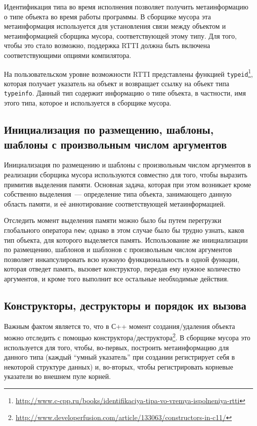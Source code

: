 Идентификация типа во время исполнения позволяет получить метаинформацию о типе объекта во время работы программы. 
В сборщике мусора эта метаинформация используется для установления связи между объектом и метаинформацией сборщика
мусора, соответствующей этому типу. Для того, чтобы это стало возможно, поддержка RTTI должна быть включена 
соответствующими опциями компилятора.

На пользовательском уровне возможности RTTI представлены функцией \lstinline{typeid}\footnote{\url{http://www.c-cpp.ru/books/identifikaciya-tipa-vo-vremya-ispolneniya-rtti}},
которая получает указатель на объект и возвращает ссылку на объект типа \lstinline{typeinfo}. Данный тип
содержит информацию о типе объекта, в частности, имя этого типа, которое и используется в сборщике мусора.

\subsection{Инициализация по размещению, шаблоны,\\
шаблоны с произвольным числом аргументов} 

Инициализация по размещению и шаблоны с произвольным числом аргументов в реализации сборщика мусора используются 
совместно для того, чтобы выразить примитив выделения памяти. Основная задача, которая при этом возникает 
кроме собственно выделения~--- определение типа объекта, занимающего данную область памяти, и её аннотирование
соответствующей метаинформацией. 

Отследить момент выделения памяти можно было бы путем перегрузки глобального оператора \lstinline{new}; однако
в этом случае было бы трудно узнать, каков тип объекта, для которого выделяется память. Использование же
инициализации по размещению, шаблонов и шаблонов с произвольным числом аргументов позволяет инкапсулировать
всю нужную функциональность в одной функции, которая отведет память, вызовет конструктор, передав
ему нужное количество аргументов, и кроме того выполнит все остальные необходимые действия.

 \subsection{Конструкторы, деструкторы и порядок их вызова} 

Важным фактом является то, что в С++ момент создания/удаления объекта можно отследить с помощью 
конструктора/деструктора\footnote{\url{http://www.developerfusion.com/article/133063/constructors-in-c11/}}. 
В сборщике мусора это используется для того, чтобы, во-первых, построить метаинформацию для данного типа (каждый
``умный указатель'' при создании регистрирует себя в некоторой структуре данных) и, во-вторых, чтобы регистрировать
корневые указатели во внешнем пуле корней.

